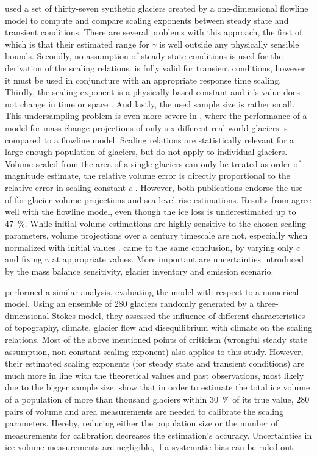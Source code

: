     \citet{Radic2007} used a set of thirty-seven synthetic glaciers created by a one-dimensional flowline model to compute and compare scaling exponents between steady state and transient conditions. There are several problems with this approach, the first of which is that their estimated range for $\gamma$ is well outside any physically sensible bounds. Secondly, no assumption of steady state conditions is used for the derivation of the scaling relations. \Vas{} is fully valid for transient conditions, however it must be used in conjuncture with an appropriate response time scaling. Thirdly, the scaling exponent is a physically based constant and it's value does not change in time or space \citep{Bahr2015}. And lastly, the used sample size is rather small. This undersampling problem is even more severe in \citet{Radic2008}, where the performance of a \vas{} model for mass change projections of only six different real world glaciers is compared to a flowline model. Scaling relations are statistically relevant for a large enough population of glaciers, but do not apply to individual glaciers. Volume scaled from the area of a single glaciers can only be treated as order of magnitude estimate, the relative volume error is directly proportional to the relative error in scaling constant $c$ \citep{Bahr2015}. However, both publications endorse the use of \vas{} for glacier volume projections and sea level rise estimations. Results from \vas{} agree well with the flowline model, even though the ice loss is underestimated up to \SI{47}{\percent}. While initial volume estimations are highly sensitive to the chosen scaling parameters, volume projections over a century timescale are not, especially when normalized with initial values \citep{Radic2007, Radic2008}. \citet{Slangen2011} came to the same conclusion, by varying only $c$ and fixing $\gamma$ at appropriate values. More important are uncertainties introduced by the mass balance sensitivity, glacier inventory and emission scenario.

    \citet{Adhikari2012} performed a similar analysis, evaluating the \vas{} model with respect to a numerical model. Using an ensemble of 280 glaciers randomly generated by a three-dimensional Stokes model, they assessed the influence of different characteristics of topography, climate, glacier flow and disequilibrium with climate on the scaling relations. Most of the above mentioned points of criticism (wrongful steady state assumption, non-constant scaling exponent) also applies to this study. However, their estimated scaling exponents (for steady state and transient conditions) are much more in line with the theoretical values and past observations, most likely due to the bigger sample size. \citet{Farinotti2013} show that in order to estimate the total ice volume of a population of more than thousand glaciers within \SI{30}{\percent} of its true value, 280 pairs of volume and area measurements are needed to calibrate the scaling parameters. Hereby, reducing either the population size or the number of measurements for calibration decreases the estimation's accuracy. Uncertainties in ice volume measurements are negligible, if a systematic bias can be ruled out.

